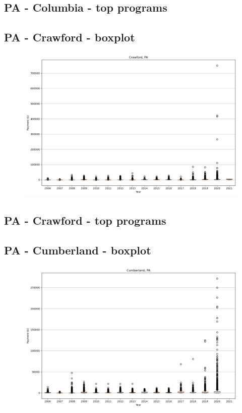 \subsection*{PA - Columbia - top programs}

\newpage
\subsection*{PA - Crawford - boxplot}
\begin{figure}[h]
\centering
\includegraphics[width=7in]{../output/boxplots/counties/Crawford-PA_boxplot.png}
\end{figure}


\subsection*{PA - Crawford - top programs}

\newpage
\subsection*{PA - Cumberland - boxplot}
\begin{figure}[h]
\centering
\includegraphics[width=7in]{../output/boxplots/counties/Cumberland-PA_boxplot.png}
\end{figure}


